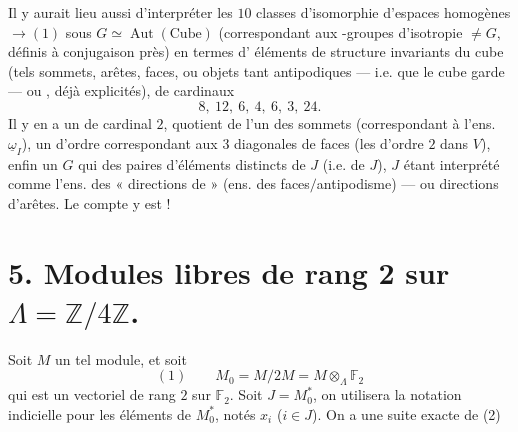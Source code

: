 \documentclass[11pt,a4paper]{article}
\begin{document}
Il y aurait lieu aussi d'interpréter les $10$ classes d'isomorphie d'espaces homogènes $\to(1)$ sous $G \simeq \operatorname{Aut}(\text{Cube})$ (correspondant aux  -groupes d'isotropie $\neq G$, définis à conjugaison près) en termes d' éléments de structure invariants du cube (tels sommets, arêtes, faces, ou  objets tant antipodiques --- i.e. que le cube garde --- ou  \struck{\ill{}} , déjà explicités), de cardinaux
\[
  8,\ 12,\ 6,\ 4,\ 6,\ 3,\ 24 .
\]
Il y en a un de cardinal $2$, quotient de l'un des sommets (correspondant à l'ens. $\underline{\omega}_I$), un \ill{} d'ordre  correspondant aux $3$ diagonales de faces (les  \add{\ill{}} \ill{} d'ordre $2$ \ill{} dans $V$), enfin un \struck{\ill{}} $G$ qui \struck{\ill{}} \ill{} des paires d'éléments distincts de $J$ (i.e. \ill{} de $J$), $J$ étant interprété comme l'ens. des « directions de \struck{\ill{}}  » \struck{(\ill{})} (ens. des faces$/$antipodisme) --- ou directions d'arêtes. Le compte y est !

\section{5. Modules libres de rang 2 sur $\Lambda = \mathbb{Z}/4\mathbb{Z}$.}

Soit $M$ un tel module, et soit
\[
  (1) \qquad M_0 = M/2M = M \otimes_\Lambda \mathbb{F}_2
\]
qui est un vectoriel de rang $2$ sur $\mathbb{F}_2$. Soit $J = M_0^*$, on utilisera la notation indicielle pour les éléments de $M_0^*$, notés $x_i$ ($i \in J$). 
On a une suite exacte de  
(2)
\end{document}

